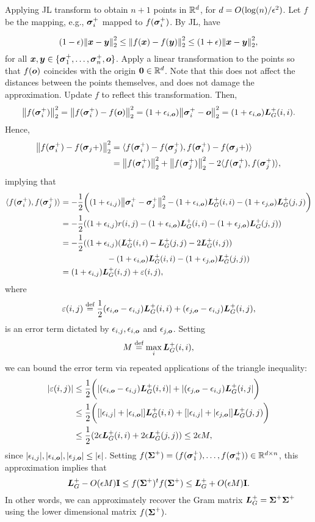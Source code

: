 Applying JL transform to obtain $n+1$ points in $\mathbb{R}^d$, for $d=O(\log(n)/\epsilon^2)$. Let $f$ be the mapping, e.g., $\vb*{\sigma}_i^+$ mapped to $f(\vb*{\sigma}_i^+)$. By JL, have 

\[(1-\epsilon)\norm{\vb*{x}-\vb*{y}}_2^2\leq  \norm{f(\vb*{x}) -f(\vb*{y})}_2^2\leq (1+\epsilon)\norm{\vb*{x}-\vb*{y}}_2^2, \]
for all $\vb*{x},\vb*{y}\in \{\vb*{\sigma}_1^+,\dots,\vb*{\sigma}_n^+,\vb*{o}\}$. 
Apply a linear transformation to the points so that $f(\vb*{o})$ coincides with the origin $\vb{0}\in\mathbb{R}^d$. Note that this does not affect the distances between the points themselves, and does not damage the approximation. Update $f$ to reflect this transformation. Then, 
\[\norm{f(\vb*{\sigma}_i^+)}_2^2 = \norm{f(\vb*{\sigma}_i^+)-f(\vb*{o})}_2^2 = (1+\epsilon_{i,\vb*{o}})\norm{\vb*{\sigma}_i^+-\vb*{o}}_2^2 = (1+\epsilon_{i,\vb*{o}})\vb*{L}_G^+(i,i).\]
Hence, 
\begin{align*}
    \norm{f(\vb*{\sigma}_i^+)-f(\vb*{\sigma}_j+)}_2^2 &= \langle f(\vb*{\sigma}_i^+)-f(\vb*{\sigma}_j^+),f(\vb*{\sigma}_i^+)-f(\vb*{\sigma}_j+)\rangle \\
    &= \norm{f(\vb*{\sigma}_i^+)}_2^2 + \norm{f(\vb*{\sigma}_j^+)}_2^2 - 2\langle f(\vb*{\sigma}_i^+),f(\vb*{\sigma}_j^+)\rangle,  
\end{align*}
implying that 
\begin{align*}
    \langle f(\vb*{\sigma}_i^+),f(\vb*{\sigma}_j^+) \rangle &= -\frac{1}{2} \bigg((1+\epsilon_{i,j})\norm{\vb*{\sigma}_i^+-\vb*{\sigma}_j^+}_2^2 - (1+\epsilon_{i,\vb*{o}})\vb*{L}_G^+(i,i) - (1+\epsilon_{j,\vb*{o}})\vb*{L}_G^+(j,j)\bigg) \\
    &= -\frac{1}{2}((1+\epsilon_{i,j})r(i,j) - (1+\epsilon_{i,\vb*{o}})\vb*{L}_G^+(i,i) - (1+\epsilon_{j,\vb*{o}})\vb*{L}_G^+(j,j)) \\
    &= -\frac{1}{2}((1+\epsilon_{i,j})(\vb*{L}_G^+(i,i) - \vb*{L}_G^+(j,j) - 2\vb*{L}_G^+(i,j)) \\
    &\hspace{2cm}- (1+\epsilon_{i,\vb*{o}})\vb*{L}_G^+(i,i) - (1+\epsilon_{j,\vb*{o}})\vb*{L}_G^+(j,j))\\
    &= (1+\epsilon_{i,j})\vb*{L}_G^+(i,j) + \varepsilon(i,j),
\end{align*}
where 
\[\varepsilon(i,j)\overset{\text{def}}{=} \frac{1}{2}(\epsilon_{i,\vb*{o}}-\epsilon_{i,j})\vb*{L}_G^+(i,i) + (\epsilon_{j,\vb*{o}}-\epsilon_{i,j})\vb*{L}_G^+(i,j),\]
is an error term dictated by $\epsilon_{i,j}, \epsilon_{i,\vb*{o}}$ and $\epsilon_{j,\vb*{o}}$. Setting 
\[M\overset{\text{def}}{=} \max_i \vb*{L}_G^+(i,i),\]
we can bound the error term via repeated applications of the triangle inequality: 
\begin{align*}
    |\varepsilon(i,j)|& \leq \frac{1}{2}\bigg(|(\epsilon_{i,\vb*{o}}-\epsilon_{i,j})\vb*{L}_G^+(i,i)| + |(\epsilon_{j,\vb*{o}}-\epsilon_{i,j})\vb*{L}_G^+(i,j|\bigg) \\
    & \leq \frac{1}{2}\bigg([|\epsilon_{i,j}|+|\epsilon_{i,\vb*{o}}|]\vb*{L}_G^+(i,i) + [|\epsilon_{i,j}|+|\epsilon_{j,\vb*{o}}|]\vb*{L}_G^+(j,j)\bigg) \\
    &\leq \frac{1}{2} ( 2\epsilon\vb*{L}_G^+(i,i) + 2\epsilon\vb*{L}_G^+(j,j) ) \leq 2\epsilon M,
\end{align*}
since $|\epsilon_{i,j}|, |\epsilon_{i,\vb*{o}}|,|\epsilon_{j,\vb*{o}}|\leq |\epsilon|$. Setting $f(\boldsymbol{\Sigma}^+) = (f(\vb*{\sigma}_1^+),\dots,f(\vb*{\sigma}_n^+))\in \mathbb{R}^{d\times n}$, this approximation implies that 
\begin{equation*}
    \vb*{L}_G^+ - O(\epsilon M)\vb{I} \leq f(\boldsymbol{\Sigma}^+)^t f(\boldsymbol{\Sigma}^+) \leq \vb*{L}_G^+ + O(\epsilon M)\vb{I}. 
\end{equation*}
In other words, we can approximately recover the Gram matrix $\vb*{L}_G^+=\boldsymbol{\Sigma}^+\boldsymbol{\Sigma}^+$ using the lower dimensional matrix $f(\boldsymbol{\Sigma}^+)$. 


